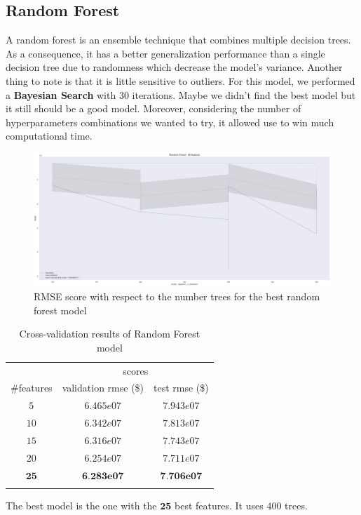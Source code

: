 \subsection{Random Forest}

A random forest is an ensemble technique that combines multiple decision trees. As a consequence, it has a better generalization performance than a single decision tree due to randomness which decrease the model's variance. Another thing to note is that it is little sensitive to outliers. For this model, we performed a \textbf{Bayesian Search} with $30$ iterations. Maybe we didn't find the best model but it still should be a good model. Moreover, considering the number of hyperparameters combinations we wanted to try, it allowed use to win much computational time. 

\begin{figure}[H]
	\centering
	\includegraphics{figures/rf_eval.pdf}
	\caption{RMSE score with respect to the number trees for the best random forest model}
	\label{fig:rf_eval}
\end{figure}

\begin{table}[H]
	\centering
	\begin{tabular}{ccc} \toprule
	  & \multicolumn {2}{c}{scores} \\\cmidrule(lr) {2-3}
	  \#features         & validation rmse (\$)             & test rmse (\$) \\\hline
	  $5$        		& $6.465e07	$                      	& $7.943e07$ \\
	  $10$        		& $6.342e07$                        & $7.813e07$ \\
	  $15$        		& $6.316e07$                        & $7.743e07$ \\
	  $20$             	& $6.254e07$                        & $7.711e07$ \\
	  $\textbf{25}$     & $\textbf{6.283e07}$               & $\textbf{7.706e07}$ \\
	  \\\hline
	\end{tabular}
	\caption{Cross-validation results of Random Forest model}
	\label{tab:rf-results}
\end{table}

The best model is the one with the $\textbf{25}$ best features. It uses $400$ trees.